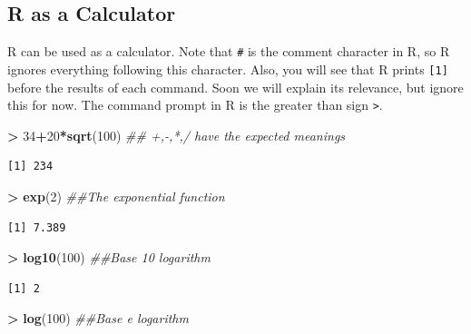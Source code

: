 \documentclass[
]{krantz}
\makeatletter
\newenvironment{Shaded}{\begin{snugshade}}{\end{snugshade}}
\newcommand{\CommentTok}[1]{\textcolor[rgb]{0.37,0.37,0.37}{\textit{#1}}}
\newcommand{\DecValTok}[1]{\textcolor[rgb]{0.06,0.06,0.06}{#1}}
\newcommand{\KeywordTok}[1]{\textcolor[rgb]{0.27,0.27,0.27}{\textbf{#1}}}
\newcommand{\NormalTok}[1]{#1}
\newcommand{\OperatorTok}[1]{\textcolor[rgb]{0.43,0.43,0.43}{\textbf{#1}}}
\newcommand{\StringTok}[1]{\textcolor[rgb]{0.5,0.5,0.5}{#1}}
\newenvironment{kframe}{%
\medskip{}
\setlength{\fboxsep}{.8em}
 \def\at@end@of@kframe{}%
 \ifinner\ifhmode%
  \def\at@end@of@kframe{\end{minipage}}%
  \begin{minipage}{\columnwidth}%
 \fi\fi%
 \def\FrameCommand##1{\hskip\@totalleftmargin \hskip-\fboxsep
 \colorbox{shadecolor}{##1}\hskip-\fboxsep
     \hskip-\linewidth \hskip-\@totalleftmargin \hskip\columnwidth}%
 \MakeFramed {\advance\hsize-\width
   \@totalleftmargin\z@ \linewidth\hsize
   \@setminipage}}%
 {\par\unskip\endMakeFramed%
 \at@end@of@kframe}
\renewenvironment{Shaded}{\begin{kframe}}{\end{kframe}}
\makeatother
\begin{document}
\hypertarget{r-as-a-calculator}{%
\subsection{R as a Calculator}\label{r-as-a-calculator}}

R can be used as a calculator. Note that \texttt{\#} is the comment character in R, so R ignores everything following this character. Also, you will see that R prints \texttt{{[}1{]}} before the results of each command. Soon we will explain its relevance, but ignore this for now. The command prompt in R is the greater than sign \texttt{\textgreater{}}.

\begin{Shaded}
\begin{Highlighting}[]
\OperatorTok{\textgreater{}}\StringTok{ }\DecValTok{34}\OperatorTok{+}\DecValTok{20}\OperatorTok{*}\KeywordTok{sqrt}\NormalTok{(}\DecValTok{100}\NormalTok{)  }\CommentTok{\#\# +,{-},*,/ have the expected meanings}
\end{Highlighting}
\end{Shaded}

\begin{verbatim}
[1] 234
\end{verbatim}

\begin{Shaded}
\begin{Highlighting}[]
\OperatorTok{\textgreater{}}\StringTok{ }\KeywordTok{exp}\NormalTok{(}\DecValTok{2}\NormalTok{)  }\CommentTok{\#\#The exponential function}
\end{Highlighting}
\end{Shaded}

\begin{verbatim}
[1] 7.389
\end{verbatim}

\begin{Shaded}
\begin{Highlighting}[]
\OperatorTok{\textgreater{}}\StringTok{ }\KeywordTok{log10}\NormalTok{(}\DecValTok{100}\NormalTok{)  }\CommentTok{\#\#Base 10 logarithm}
\end{Highlighting}
\end{Shaded}

\begin{verbatim}
[1] 2
\end{verbatim}

\begin{Shaded}
\begin{Highlighting}[]
\OperatorTok{\textgreater{}}\StringTok{ }\KeywordTok{log}\NormalTok{(}\DecValTok{100}\NormalTok{)  }\CommentTok{\#\#Base e logarithm}
\end{Highlighting}
\end{Shaded}
\end{document}
